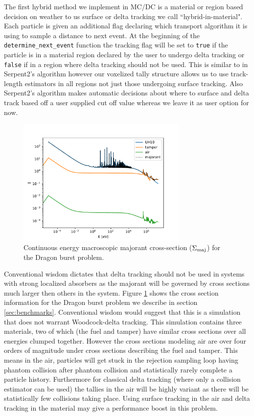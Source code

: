 The first hybrid method we implement in MC/DC is a material or region based decision on weather to us surface or delta tracking we call ``hybrid-in-material".
Each particle is given an additional flag declaring which transport algorithm it is using to sample a distance to next event.
At the beginning of the \texttt{determine\_next\_event} function the tracking flag will be set to \texttt{true} if the particle is in a material region declared by the user to undergo delta tracking or \texttt{false} if in a region where delta tracking should not be used. 
This is similar to in Serpent2's algorithm however our voxelized tally structure allows us to use track-length estimators in all regions not just those undergoing surface tracking.
Also Serpent2's algorithm makes automatic decisions about where to surface and delta track based off a user supplied cut off value \cite{leppanen_development_2013} whereas we leave it as user option for now.


\begin{figure}
    \centering
    \includegraphics[width=0.75\textwidth]{figures/delta_figs/macro_majorant_dragon.pdf}
    \caption{Continuous energy macroscopic majorant cross-section ($\Sigma_{\text{maj}}$) for the Dragon burst problem.}
    \label{fig:majorant_dragon}
\end{figure}

Conventional wisdom dictates that delta tracking should not be used in systems with strong localized absorbers as the majorant will be governed by cross sections much larger then others in the system.
Figure \ref{fig:majorant_dragon} shows the cross section information for the Dragon burst problem we describe in section \ref{sec:benchmarks}.
Conventional wisdom would suggest that this is a simulation that does not warrant Woodcock-delta tracking.
This simulation contains three materials, two of which (the fuel and tamper) have similar cross sections over all energies clumped together.
However the cross sections modeling air are over four orders of magnitude under cross sections describing the fuel and tamper.
This means in the air, particles will get stuck in the rejection sampling loop having phantom collision after phantom collision and statistically rarely complete a particle history.
Furthermore for classical delta tracking (where only a collision estimator can be used) the tallies in the air will be highly variant as there will be statistically few collisions taking place.
Using surface tracking in the air and delta tracking in the material may give a performance boost in this problem.

